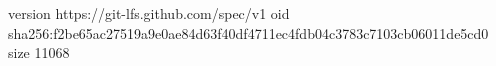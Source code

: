 version https://git-lfs.github.com/spec/v1
oid sha256:f2be65ac27519a9e0ae84d63f40df4711ec4fdb04c3783c7103cb06011de5cd0
size 11068
